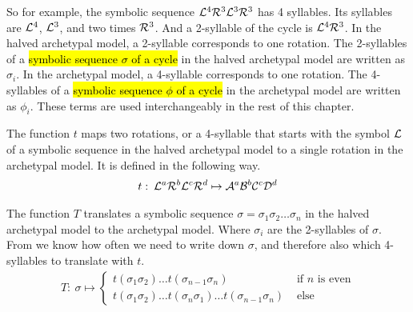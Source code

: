 So for example, the symbolic sequence $\mathcal{L}^4\mathcal{R}^3\mathcal{L}^3\mathcal{R}^3$ has 4 syllables.
Its syllables are $\mathcal{L}^4$, $\mathcal{L}^3$, and two times $\mathcal{R}^3$.
And a 2-syllable of the cycle is $\mathcal{L}^4\mathcal{R}^3$.
In the halved archetypal model, a 2-syllable corresponds to one rotation.
The 2-syllables of a \hl{symbolic sequence $\sigma$ of a cycle} in the halved archetypal model are written as $\sigma_i$.
In the archetypal model, a 4-syllable corresponds to one rotation.
The 4-syllables of a \hl{symbolic sequence $\phi$ of a cycle} in the archetypal model are written as $\phi_i$.
These terms are used interchangeably in the rest of this chapter.

\begin{definition}
	\label{def:t}
	The function $t$ maps two rotations, or a 4-syllable that starts with the symbol $\mathcal{L}$ of a symbolic sequence in the halved archetypal model to a single rotation in the archetypal model.
	It is defined in the following way.
	\begin{align}
		t:\: \mathcal{L}^a\mathcal{R}^b\mathcal{L}^c\mathcal{R}^d \mapsto \mathcal{A}^a\mathcal{B}^b\mathcal{C}^c\mathcal{D}^d
	\end{align}
\end{definition}

\begin{definition}
	\label{def:T}
	The function $T$ translates a symbolic sequence $\sigma = \sigma_1\sigma_2 \dots \sigma_n$ in the halved archetypal model to the archetypal model.
	Where $\sigma_i$ are the 2-syllables of $\sigma$.
	From  we know how often we need to write down $\sigma$, and therefore also which 4-syllables to translate with $t$.
	\begin{align}
		T:\: \sigma \mapsto \begin{cases}
			                    t(\sigma_1\sigma_2) \dots t(\sigma_{n-1}\sigma_n)                           & \text{ if $n$ is even} \\
			                    t(\sigma_1\sigma_2) \dots t(\sigma_n\sigma_1) \dots t(\sigma_{n-1}\sigma_n) & \text{ else}
		                    \end{cases}
	\end{align}
\end{definition}

